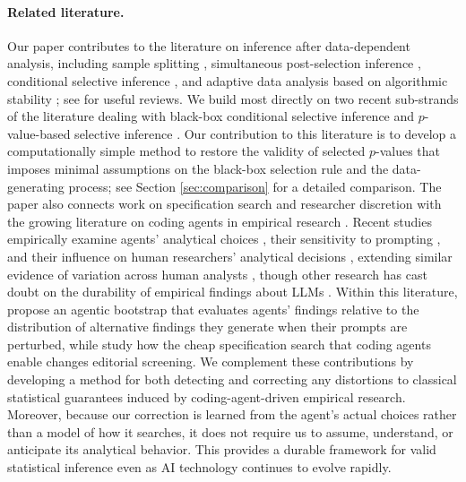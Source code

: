 \documentclass[10pt]{article}
\begin{document}
\paragraph{Related literature.}
Our paper contributes to the literature on inference after data-dependent analysis, including sample splitting \citep{cox1975note}, simultaneous post-selection inference \citep{berk2013valid}, conditional selective inference \citep{fithian2014optimal, tibshirani2016exact, lee2016exact,tian2018selective,andrews2024inference}, and adaptive data analysis based on algorithmic stability \citep{dwork2015preserving,zrnic2023post}; see \citet{kuchibhotla2022post,neufeld2026inference} for useful reviews. We build most directly on two recent sub-strands of the literature dealing with black-box conditional selective inference \citep{markovic2019inference,liu2022black,liu2025flexible} and $p$-value-based selective inference \citep{sood2024selective}. Our contribution to this literature is to develop a computationally simple method to restore the validity of selected $p$-values that imposes minimal assumptions on the black-box selection rule and the data-generating process; see Section \ref{sec:comparison} for a detailed comparison. The paper also connects work on specification search and researcher discretion \citep{white2000reality,simmons2011false,mccloskey2026critical} with the growing literature on coding agents in empirical research \citep{korinek2025agents}. Recent studies empirically examine agents' analytical choices \citep{bertran2026many,gao2026nonstandard,mccully2026research, galiani2026ai, asher2026claude}, their sensitivity to prompting \citep{asher2026claude,miao2026agentic}, and their influence on human researchers' analytical decisions \citep{herdagdelens}, extending similar evidence of variation across human analysts \citep{silberzahn2018many,huntington2021influence,breznau2022observing}, though other research has cast doubt on the durability of empirical findings about LLMs \citep{queen2026shelflife}. Within this literature, \citet{miao2026agentic} propose an agentic bootstrap that evaluates agents' findings relative to the distribution of alternative findings they generate when their prompts are perturbed, while \citet{fishman2026editorial} study how the cheap specification search that coding agents enable changes editorial screening. We complement these contributions by developing a method for both detecting and correcting any distortions to classical statistical guarantees induced by coding-agent-driven empirical research. Moreover, because our correction is learned from the agent's actual choices rather than a model of how it searches, it does not require us to assume, understand, or anticipate its analytical behavior. This provides a durable framework for valid statistical inference even as AI technology continues to evolve rapidly.
\end{document}
